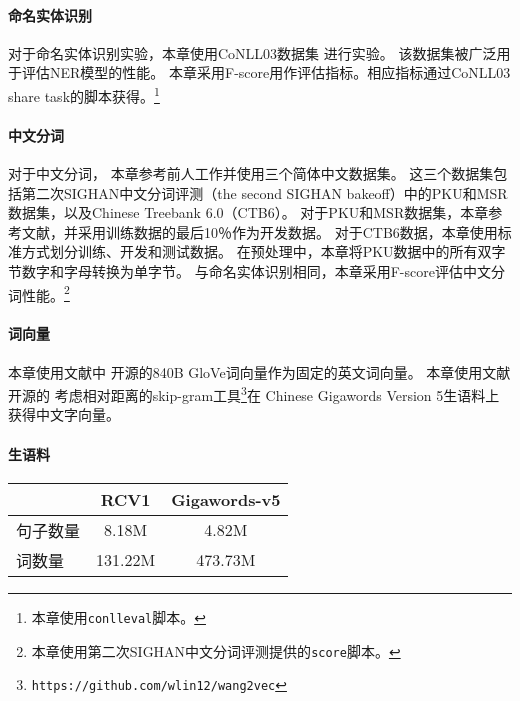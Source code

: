 \paragraph{命名实体识别}
对于命名实体识别实验，本章使用CoNLL03数据集 \cite{TjongKimSang-DeMeulder:2003:CONLL}进行实验。
该数据集被广泛用于评估NER模型的性能。
本章采用F-score用作评估指标。相应指标通过CoNLL03 share task的脚本获得。\footnote{本章使用\texttt{conlleval}脚本。}

\paragraph{中文分词}
对于中文分词，
本章参考前人工作并使用三个简体中文数据集。
这三个数据集包括第二次SIGHAN中文分词评测（the second SIGHAN bakeoff）中的PKU和MSR数据集，以及Chinese Treebank 6.0（CT​​B6）。
对于PKU和MSR数据集，本章参考文献，并采用训练数据的最后10％作为开发数据。
对于CTB6数据，本章使用标准方式划分训练、开发和测试数据。
在预处理中，本章将PKU数据中的所有双字节数字和字母转换为单字节。
与命名实体识别相同，本章采用F-score评估中文分词性能。\footnote{本章使用第二次SIGHAN中文分词评测提供的\texttt{score}脚本。}

\paragraph{词向量}
本章使用文献中
开源的840B GloVe词向量作为固定的英文词向量。
本章使用文献开源的
考虑相对距离的skip-gram工具\footnote{\tt https://github.com/wlin12/wang2vec}在
Chinese Gigawords Version 5生语料上获得中文字向量。

\paragraph{生语料}
\begin{table}[t]
	\vspace{0.5em}\centering\wuhao
	\begin{tabular}{lc c}
		\toprule[1.5pt]
		& RCV1 & Gigawords-v5 \\
		\midrule[1pt]
		句子数量 & 8.18M & 4.82M \\
		词数量 & 131.22M &  473.73M \\
		\bottomrule[1.5pt]
	\end{tabular}
\end{table}

